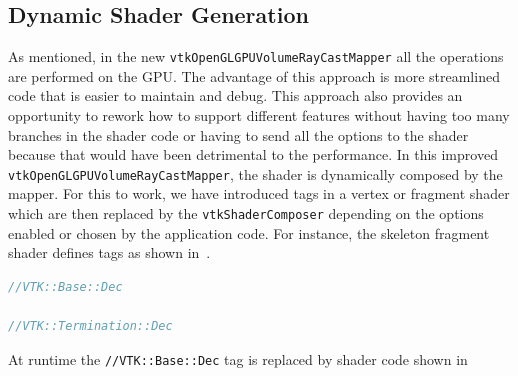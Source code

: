 \subsection{Dynamic Shader Generation}
As mentioned, in the new \texttt{vtkOpenGLGPUVolumeRayCastMapper} all the operations are
performed on the GPU. The advantage of this approach is more streamlined code
that is easier to maintain and debug. This approach also provides an opportunity
to rework how to support different features without having too many branches in
the shader code or having to send all the options to the shader because that
would have been detrimental to the performance. In this improved
\texttt{vtkOpenGLGPUVolumeRayCastMapper}, the shader is dynamically composed by
the mapper. For this to work, we have introduced tags in a vertex or fragment
shader which are then replaced by the \texttt{vtkShaderComposer} depending on
the options enabled or chosen by the application code. For instance, the
skeleton fragment shader defines tags as shown in~.

\begin{lstlisting}[language=C++, caption={Fragment shader tags},
                   captionpos=b, frame=single, breaklines=true,
                   label=lst:skeletonshader]
//VTK::Base::Dec

//VTK::Termination::Dec

\end{lstlisting}

At runtime the \texttt{//VTK::Base::Dec} tag is replaced by shader code
shown in~

